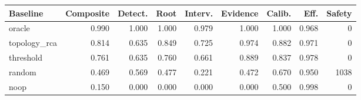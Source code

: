 \begin{tabular}{lrrrrrrrr}
\toprule
Baseline & Composite & Detect. & Root & Interv. & Evidence & Calib. & Eff. & Safety \\
\midrule
oracle & 0.990 & 1.000 & 1.000 & 0.979 & 1.000 & 1.000 & 0.968 & 0 \\
topology\_rca & 0.814 & 0.635 & 0.849 & 0.725 & 0.974 & 0.882 & 0.971 & 0 \\
threshold & 0.761 & 0.635 & 0.760 & 0.661 & 0.889 & 0.837 & 0.978 & 0 \\
random & 0.469 & 0.569 & 0.477 & 0.221 & 0.472 & 0.670 & 0.950 & 1038 \\
noop & 0.150 & 0.000 & 0.000 & 0.000 & 0.000 & 0.500 & 0.998 & 0 \\
\bottomrule
\end{tabular}

